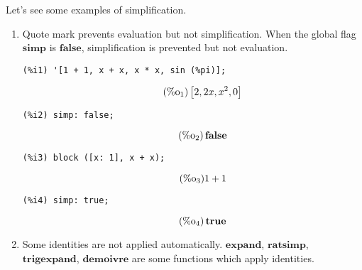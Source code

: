 \documentclass[12pt,leqno]{article}
\begin{document}
Let's see some examples of simplification.

\begin{enumerate}

\item Quote mark prevents evaluation but not simplification.
When the global flag $\mathbf{simp}$ is $\mathbf{false}$,
simplification is prevented but not evaluation.

\begin{verbatim}
(%i1) '[1 + 1, x + x, x * x, sin (%pi)];
\end{verbatim}
\begin{equation}
\tag{$\mathop{\mathrm{\%o}}_{1}$}\left[2, 2 x, {x}^{2}, 0\right]
\label{eq:doc-group1-code21-1-1}
\end{equation}
\begin{verbatim}
(%i2) simp: false;
\end{verbatim}
\begin{equation}
\tag{$\mathop{\mathrm{\%o}}_{2}$}\mathop{\mathbf{false}}
\label{eq:doc-group1-code21-2-1}
\end{equation}
\begin{verbatim}
(%i3) block ([x: 1], x + x);
\end{verbatim}
\begin{equation}
\tag{$\mathop{\mathrm{\%o}}_{3}$}1+1
\label{eq:doc-group1-code21-3-1}
\end{equation}
\begin{verbatim}
(%i4) simp: true;
\end{verbatim}
\begin{equation}
\tag{$\mathop{\mathrm{\%o}}_{4}$}\mathop{\mathbf{true}}
\label{eq:doc-group1-code21-4-1}
\end{equation}


\item Some identities are not applied automatically.
$\mathbf{expand}$, $\mathbf{ratsimp}$, $\mathbf{trigexpand}$, $\mathbf{demoivre}$
are some functions which apply identities.


\end{enumerate}
\end{document}
